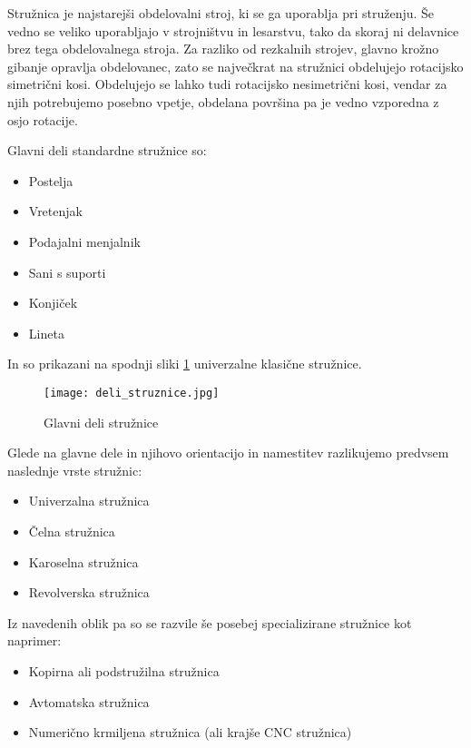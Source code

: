 Stružnica je najstarejši obdelovalni stroj,
ki se ga uporablja pri struženju. Še vedno se
veliko uporabljajo v strojništvu in lesarstvu,
tako da skoraj ni delavnice brez tega obdelovalnega stroja.
Za razliko od rezkalnih strojev, glavno krožno gibanje opravlja
obdelovanec, zato se največkrat na stružnici obdelujejo rotacijsko
simetrični kosi. Obdelujejo se lahko tudi rotacijsko nesimetrični kosi,
vendar za njih potrebujemo posebno vpetje, obdelana površina pa je
vedno vzporedna z osjo rotacije.

\noindent Glavni deli standardne stružnice so:
\begin{itemize}
	\item Postelja
	\item Vretenjak
	\item Podajalni menjalnik
	\item Sani s suporti
	\item Konjiček
	\item Lineta
\end{itemize}

In so prikazani na spodnji sliki \ref{img:deli_struznice} univerzalne klasične stružnice.
\begin{figure}[H]
	\begin{center}
		\texttt{[image: deli\_struznice.jpg]}
		\caption{Glavni deli stružnice
			\cite{deli_struznice}}
		\label{img:deli_struznice}
	\end{center}
\end{figure}

\noindent Glede na glavne dele in njihovo orientacijo in namestitev razlikujemo
predvsem naslednje vrste stružnic:
\begin{itemize}
	\item Univerzalna stružnica
	\item Čelna stružnica
	\item Karoselna stružnica
	\item Revolverska stružnica
\end{itemize}

\noindent Iz navedenih oblik pa so se razvile še posebej specializirane
stružnice kot naprimer:
\begin{itemize}
	\item Kopirna ali podstružilna stružnica
	\item Avtomatska stružnica
	\item Numerično krmiljena stružnica (ali krajše CNC stružnica)
\end{itemize}

